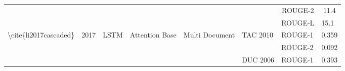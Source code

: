 \begin{table}[]
\begin{tabular}{|c|c|c|c|c|c|cc|}
                                                                                          &                                            &                                                   &                                                           &                                                                                                                        &                                                       & \multicolumn{1}{c|}{ROUGE-2}                                                                                                       & 11.4                       \\ \cline{7-8} 
                                                                                          &                                            &                                                   &                                                           &                                                                                                                        &                                                       & \multicolumn{1}{l|}{ROUGE-L}                                                                                                       & \multicolumn{1}{l|}{15.1}  \\ \hline
    \multicolumn{1}{|l|}{\multirow{6}{*}{\textbackslash{}cite\{li2017cascaded\}}}         & \multicolumn{1}{l|}{\multirow{6}{*}{2017}} & \multicolumn{1}{l|}{\multirow{6}{*}{LSTM}}        & \multicolumn{1}{l|}{\multirow{6}{*}{Attention Base}}      & \multicolumn{1}{l|}{\multirow{6}{*}{Multi Document}}                                                                   & \multicolumn{1}{l|}{\multirow{2}{*}{TAC 2010}}        & \multicolumn{1}{l|}{ROUGE-1}                                                                                                       & \multicolumn{1}{l|}{0.359} \\ \cline{7-8} 
    \multicolumn{1}{|l|}{}                                                                & \multicolumn{1}{l|}{}                      & \multicolumn{1}{l|}{}                             & \multicolumn{1}{l|}{}                                     & \multicolumn{1}{l|}{}                                                                                                  & \multicolumn{1}{l|}{}                                 & \multicolumn{1}{l|}{ROUGE-2}                                                                                                       & \multicolumn{1}{l|}{0.092} \\ \cline{6-8} 
    \multicolumn{1}{|l|}{}                                                                & \multicolumn{1}{l|}{}                      & \multicolumn{1}{l|}{}                             & \multicolumn{1}{l|}{}                                     & \multicolumn{1}{l|}{}                                                                                                  & \multicolumn{1}{l|}{\multirow{2}{*}{DUC 2006}}        & \multicolumn{1}{l|}{ROUGE-1}                                                                                                       & \multicolumn{1}{l|}{0.393} \\ \cline{7-8} 

\end{tabular}
\end{table}
